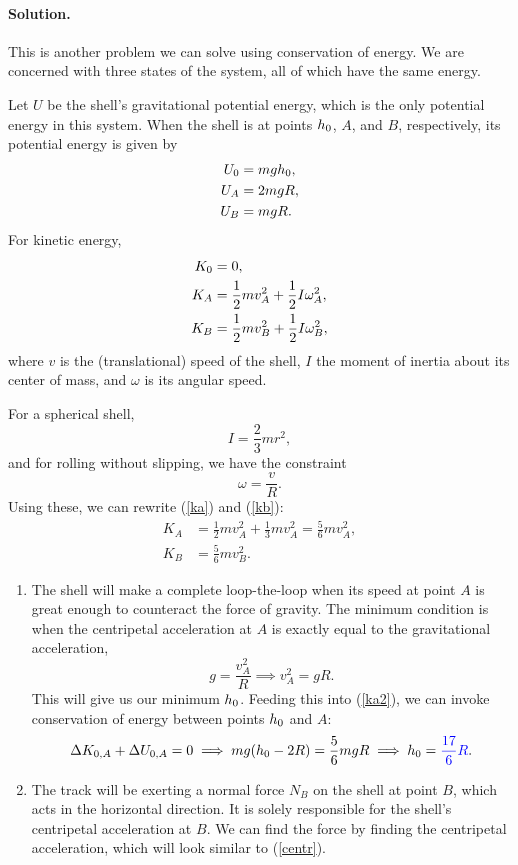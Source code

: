 \documentclass[11pt]{article}
\newcommand{\refeq}[1]{(\ref{#1})}
\newcommand{\beq}{\begin{equation*}}
\newcommand{\eeq}{\end{equation*}}
\newcommand{\beqn}{\begin{equation}}
\newcommand{\eeqn}{\end{equation}}
\newenvironment{solution}
{
    \paragraph{Solution.}
    \ignorespaces
}
{
    \bigskip
}
\begin{document}
\begin{solution}
	This is another problem we can solve using conservation of energy.  We are concerned with three states of the system, all of which have the same energy.
	
	Let $U$ be the shell's gravitational potential energy, which is the only potential energy in this system.  When the shell is at points $h_0$, $A$, and $B$, respectively, its potential energy is given by
	\begin{align*}
		U_0 &= m g h_0, \\
		U_A &= 2 m g R, \\
		U_B &= m g R.
	\end{align*}
	For kinetic energy,
	\begin{align}
		K_0 &= 0, \notag \\
		K_A &= \frac{1}{2} m v_A^2 + \frac{1}{2} I \omega_A^2, \label{ka} \\
		K_B &= \frac{1}{2} m v_B^2 + \frac{1}{2} I \omega_B^2, \label{kb}
	\end{align}
	where $v$ is the (translational) speed of the shell, $I$ the moment of inertia about its center of mass, and $\omega$ is its angular speed.
	
	For a spherical shell,
	\beq
		I = \frac{2}{3} m r^2,
	\eeq
	and for rolling without slipping, we have the constraint
	\beq
		\omega = \frac{v}{R}.
	\eeq
	Using these, we can rewrite \refeq{ka} and \refeq{kb}:
	\begin{align}
		K_A &= \frac{1}{2} m v_A^2 + \frac{1}{3} m v_A^2 = \frac{5}{6} m v_A^2, \label{ka2} \\
		K_B &= \frac{5}{6} m v_B^2. \label{kb2}
	\end{align}
	
	\begin{enumerate}
		\item The shell will make a complete loop-the-loop when its speed at point $A$ is great enough to counteract the force of gravity.  The minimum condition is when the centripetal acceleration at $A$ is exactly equal to the gravitational acceleration,
			\beqn \label{centr}
				g = \frac{v_A^2}{R} \implies v_A^2 = g R.
			\eeqn
			This will give us our minimum $h_0$.  Feeding this into \refeq{ka2}, we can invoke conservation of energy between points $h_0$ and $A$:
			\beq
				\Delta K_{0,A} + \Delta U_{0,A} = 0 \implies mg (\ho - 2R) = \frac{5}{6} mg R \implies \ho = {\color{blue} \frac{17}{6} R}.
			\eeq
		
		\item The track will be exerting a normal force $N_B$ on the shell at point $B$, which acts in the horizontal direction.  It is solely responsible for the shell's centripetal acceleration at $B$.  We can find the force by finding the centripetal acceleration, which will look similar to \refeq{centr}.
		

\end{enumerate}
\end{solution}
\end{document}

